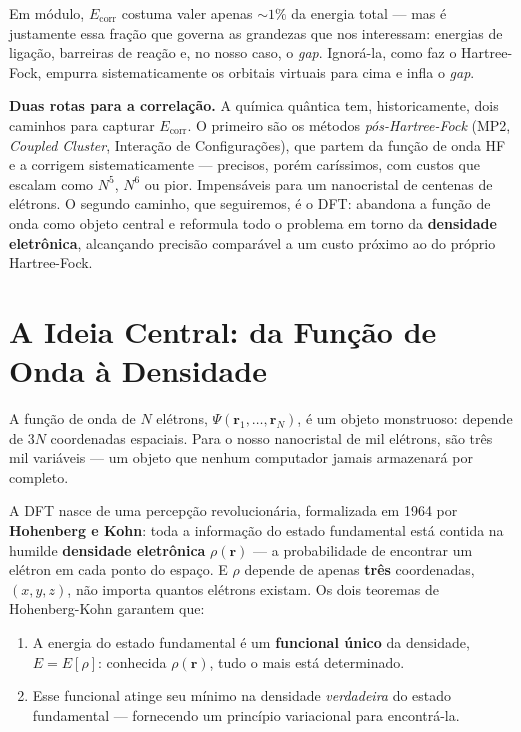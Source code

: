 \noindent
Em módulo, $E_{\text{corr}}$ costuma valer apenas $\sim 1\%$ da energia total ---
mas é justamente essa fração que governa as grandezas que nos interessam: energias
de ligação, barreiras de reação e, no nosso caso, o \emph{gap}. Ignorá-la, como
faz o Hartree-Fock, empurra sistematicamente os orbitais virtuais para cima e
infla o \emph{gap}.

\begin{caixanota}
\textbf{Duas rotas para a correlação.} A química quântica tem, historicamente,
dois caminhos para capturar $E_{\text{corr}}$. O primeiro são os métodos
\emph{pós-Hartree-Fock} (MP2, \emph{Coupled Cluster}, Interação de
Configurações), que partem da função de onda HF e a corrigem sistematicamente ---
precisos, porém caríssimos, com custos que escalam como $N^5$, $N^6$ ou pior.
Impensáveis para um nanocristal de centenas de elétrons. O segundo caminho, que
seguiremos, é o DFT: abandona a função de onda como objeto central e reformula
todo o problema em torno da \textbf{densidade eletrônica}, alcançando precisão
comparável a um custo próximo ao do próprio Hartree-Fock.
\end{caixanota}

\section{A Ideia Central: da Função de Onda à Densidade}
\label{sec:ideiadft}

A função de onda de $N$ elétrons, $\Psi(\mathbf{r}_1,\dots,\mathbf{r}_N)$, é um
objeto monstruoso: depende de $3N$ coordenadas espaciais. Para o nosso nanocristal
de mil elétrons, são três mil variáveis --- um objeto que nenhum computador jamais
armazenará por completo.

A DFT nasce de uma percepção revolucionária, formalizada em 1964 por
\textbf{Hohenberg e Kohn}: toda a informação do estado fundamental está contida na
humilde \textbf{densidade eletrônica} $\rho(\mathbf{r})$ --- a probabilidade de
encontrar um elétron em cada ponto do espaço. E $\rho$ depende de apenas
\textbf{três} coordenadas, $(x,y,z)$, não importa quantos elétrons existam. Os dois
teoremas de Hohenberg-Kohn garantem que:

\begin{enumerate}[leftmargin=*]
  \item A energia do estado fundamental é um \textbf{funcional único} da densidade,
        $E = E[\rho]$: conhecida $\rho(\mathbf{r})$, tudo o mais está determinado.
  \item Esse funcional atinge seu mínimo na densidade \emph{verdadeira} do estado
        fundamental --- fornecendo um princípio variacional para encontrá-la.
\end{enumerate}

